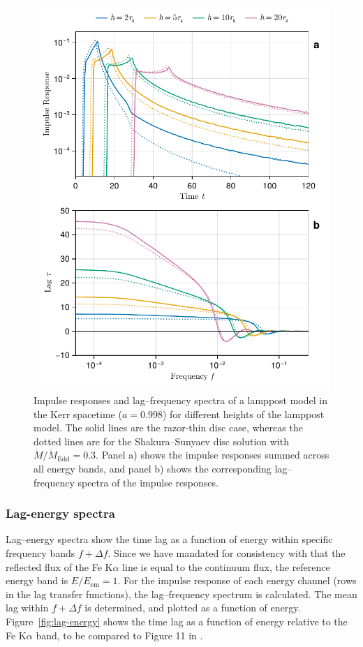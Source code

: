 \documentclass[fleqn,usenatbib]{mnras}
\newcommand{\FeKa}{Fe K$\alpha$ }
\begin{document}
\begin{figure}
    \centering
    \includegraphics[width=0.98\columnwidth]{figures/reverberation.thin-disc.pdf}
    \caption{Impulse responses and lag--frequency spectra of a lamppost model in
        the Kerr spacetime ($a = 0.998$) for different heights of the lamppost
        model. The solid lines are the razor-thin disc case, whereas the dotted
        lines are for the Shakura--Sunyaev disc solution with $\dot{M} /
        \dot{M}_\text{Edd} = 0.3$. Panel a) shows the impulse responses summed
        across all energy bands, and panel b) shows the corresponding lag--frequency
        spectra of the impulse responses. }
    \label{fig:reverberation-thin}
\end{figure}

\subsubsection{Lag-energy spectra}

Lag--energy spectra show the time lag as a function of energy within specific frequency bands $f + \Delta
f$. Since we have mandated for consistency with \cite{cackett_modelling_2014}
that the reflected flux of the \FeKa line is equal to the continuum flux,
the reference energy band is $E/E_\text{em} = 1$.  For the impulse response of
each energy channel (rows in the lag transfer functions), the lag--frequency
spectrum is calculated. The mean lag within $f + \Delta f$ is determined, and
plotted as a function of energy. Figure~\ref{fig:lag-energy} shows
the time lag as a function of energy relative to the \FeKa band,
to be compared to Figure 11 in \cite{cackett_modelling_2014}.
\end{document}
